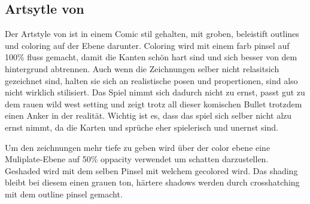 \subsection{Artsytle von \FF}\label{subsec:references}

Der Artstyle von \FF ist in einem Comic stil gehalten, mit groben, beleistift outlines und coloring auf der Ebene darunter.
Coloring wird mit einem farb pinsel auf 100\% fluss gemacht, damit die Kanten schön hart sind und sich besser von dem hintergrund abtrennen.
Auch wenn die Zeichnungen selber nicht relasitsich gezeichnet sind, halten sie sich an realistische posen und propertionen, sind also nicht wirklich stilisiert.
Das Spiel nimmt sich dadurch nicht zu ernst, passt gut zu dem rauen wild west setting und zeigt trotz all dieser komischen Bullet
trotzdem einen Anker in der realität. Wichtig ist es, dass das spiel sich selber nicht alzu ernst nimmt, da die Karten und sprüche eher
spielerisch und unernst sind.

Um den zeichnungen mehr tiefe zu geben wird über der color ebene eine Muliplate-Ebene auf 50\% oppacity verwendet um schatten
darzustellen. Geshaded wird mit dem selben Pinsel mit welchem gecolored wird. Das shading bleibt bei diesem einen grauen ton,
härtere shadows werden durch crosshatching mit dem outline pinsel gemacht.\cite{crosshatching}

%


%

\renewcommand{\kapitelautor}{}
